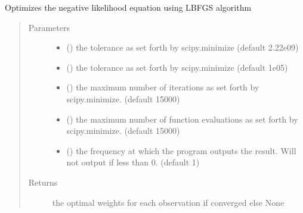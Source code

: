 \documentclass[letterpaper,10pt,english]{sphinxmanual}
\begin{document}
\begin{fulllineitems}
\begin{fulllineitems}
\end{fulllineitems}


\begin{fulllineitems}
\label{\detokenize{wham:wham.Uwham.Uwham.Maximum_likelihood}}
Optimizes the negative likelihood equation using LBFGS algorithm
\begin{quote}\begin{description}
\item[{Parameters}] \leavevmode\begin{itemize}
\item {} 
 () \textendash{} the tolerance as set forth by scipy.minimize (default 2.22e\sphinxhyphen{}09)

\item {} 
 () \textendash{} the tolerance as set forth by scipy.minimize (default 1e\sphinxhyphen{}05)

\item {} 
 () \textendash{} the maximum number of iterations as set forth by scipy.minimize. (default 15000)

\item {} 
 () \textendash{} the maximum number of function evaluations as set forth by scipy.minimize. (default 15000)

\item {} 
 () \textendash{} the frequency at which the program outputs the result. Will not output if less than 0. (default \sphinxhyphen{}1)

\end{itemize}

\item[{Returns}] \leavevmode
the optimal weights for each observation if converged else None


\end{description}
\end{quote}
\end{fulllineitems}
\end{fulllineitems}
\end{document}
